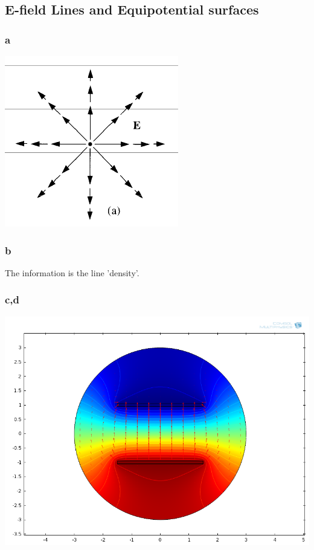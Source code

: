 \subsection{E-field Lines and Equipotential surfaces}

\subsubsection{a}
\includegraphics{img/3_1_a}

\subsubsection{b}
The information is the line 'density'.

\subsubsection{c,d}
\includegraphics[scale=0.5]{img/3_1_c,d}

